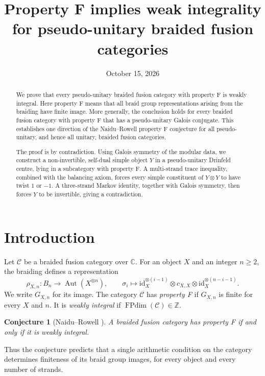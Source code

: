 \documentclass[11pt,oneside]{amsart}
\title[Property F and weak integrality]{Property F implies weak integrality\\
for pseudo-unitary braided fusion categories}
\date{October 15, 2026}
\newtheorem*{conjecture}{Conjecture}
\theoremstyle{remark}
\newcommand{\C}{\mathcal C}
\newcommand{\FP}{\operatorname{FPdim}}
\newcommand{\Z}{\mathbb Z}
\begin{document}
\pagestyle{plain}

\begin{abstract}
We prove that every pseudo-unitary braided fusion category with property F is
weakly integral. Here property F means that all braid group representations
arising from the braiding have finite image. More generally, the conclusion holds
for every braided fusion category with property F that has a pseudo-unitary Galois
conjugate. This establishes one direction of the Naidu--Rowell property F
conjecture for all pseudo-unitary, and hence all unitary, braided fusion
categories.

The proof is by contradiction. Using Galois symmetry of the modular data, we
construct a non-invertible, self-dual simple object $Y$ in a pseudo-unitary
Drinfeld centre, lying in a subcategory with property F. A multi-strand trace
inequality, combined with the balancing axiom, forces every simple constituent of
$Y\otimes Y$ to have twist $1$ or $-1$. A three-strand Markov identity, together
with Galois symmetry, then forces $Y$ to be invertible, giving a contradiction.
\end{abstract}

\maketitle

\section{Introduction}

Let $\C$ be a braided fusion category over $\mathbb C$. For an object $X$ and an
integer $n\ge2$, the braiding defines a representation
\[
\rho_{X,n}:B_n\longrightarrow\operatorname{Aut}(X^{\otimes n}),\qquad
\sigma_i\longmapsto
\mathrm{id}_X^{\otimes(i-1)}\otimes c_{X,X}\otimes
\mathrm{id}_X^{\otimes(n-i-1)}.
\]
We write $G_{X,n}$ for its image. The category $\C$ has \emph{property F} if
$G_{X,n}$ is finite for every $X$ and $n$. It is \emph{weakly integral} if
$\FP(\C)\in\Z$.

\begin{conjecture}[Naidu--Rowell {\cite{NR}}]
A braided fusion category has property F if and only if it is weakly integral.
\end{conjecture}

Thus the conjecture predicts that a single arithmetic condition on the category
determines finiteness of its braid group images, for every object and every
number of strands.
\end{document}
